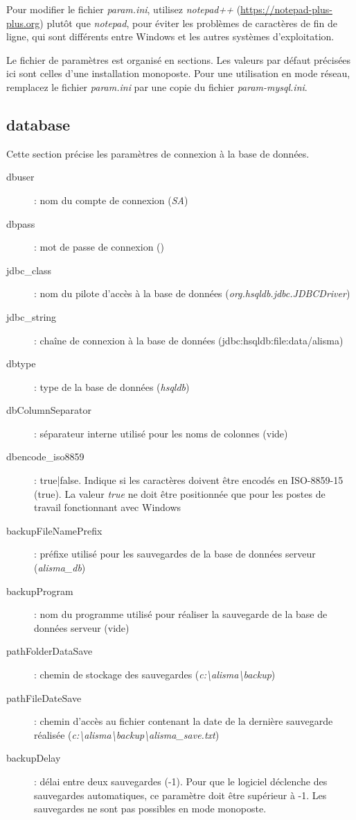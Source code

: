 Pour modifier le fichier \textit{param.ini}, utilisez \textit{notepad++} (\url{https://notepad-plus-plus.org}) plutôt que \textit{notepad}, pour éviter les problèmes de caractères de fin de ligne, qui sont différents entre Windows et les autres systèmes d'exploitation.

Le fichier de paramètres est organisé en sections. Les valeurs par défaut précisées ici sont celles d'une installation monoposte. Pour une utilisation en mode réseau, remplacez le fichier \textit{param.ini} par une copie du fichier \textit{param-mysql.ini}.

\subsection{database}
Cette section précise les paramètres de connexion à la base de données.
\begin{description}
\item [dbuser] : nom du compte de connexion (\textit{SA})
\item [dbpass] : mot de passe de connexion ()
\item [jdbc\_class] : nom du pilote d'accès à la base de données (\textit{org.hsqldb.jdbc.JDBCDriver})
\item [jdbc\_string] : chaîne de connexion à la base de données (jdbc:hsqldb:file:data/alisma)
\item [dbtype] : type de la base de données (\textit{hsqldb})
\item [dbColumnSeparator] : séparateur interne utilisé pour les noms de colonnes (vide)
\item [dbencode\_iso8859] : true|false. Indique si les caractères doivent être encodés en ISO-8859-15 (true). La valeur \textit{true} ne doit être positionnée que pour les postes de travail fonctionnant avec Windows
\item [backupFileNamePrefix] : préfixe utilisé pour les sauvegardes de la base de données serveur (\textit{alisma\_db})
\item [backupProgram] : nom du programme utilisé pour réaliser la sauvegarde de la base de données serveur (vide)
\item [pathFolderDataSave] : chemin de stockage des sauvegardes (\textit{\NoAutoSpaceBeforeFDP c:\textbackslash{}alisma\textbackslash{}backup})
\item [pathFileDateSave] : chemin d'accès au fichier contenant la date de la dernière sauvegarde réalisée (\textit{\NoAutoSpaceBeforeFDP c:\textbackslash{}alisma\textbackslash{}backup\textbackslash{}alisma\_save.txt})
\item [backupDelay] : délai entre deux sauvegardes (-1). Pour que le logiciel déclenche des sauvegardes automatiques, ce paramètre doit être supérieur à -1. Les sauvegardes ne sont pas possibles en mode monoposte.
\end{description}

